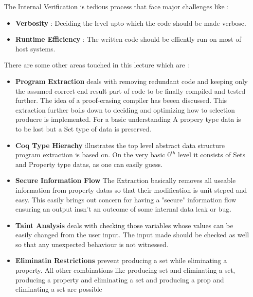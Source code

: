\documentclass[paper=a4, fontsize=11pt]{scrartcl}
\numberwithin{equation}{section}		%
\numberwithin{figure}{section}			%
\numberwithin{table}{section}				%
\begin{document}
The Internal Verification is tedious process that face major challenges like :

\begin{itemize}
	\item{\textbf{Verbosity} : Deciding the level upto which the code should be made verbose. }
	\item{\textbf{Runtime Efficiency} : The written code should be effiently run on most of host systems.} 
\end{itemize}

There are some other areas touched in this lecture which are :
\begin{itemize}
\item{ \textbf{Program Extraction} deals with removing redundant code and keeping only the assumed correct end result part of code to be finally compiled and tested further. The idea of a proof-erasing compiler has beeen discussed. This extraction further boils down to deciding and optimizing how to selection producre is implemented. For a basic understanding A propery type data is to be lost but a Set type of data is preserved.
}
\item{\textbf{Coq Type Hierachy} illustrates the top level abstract data structure program extraction is based on. On the very basic $0^{th}$ level it consists of Sets and Property type datas, as one can easily guess.
}
\item{\textbf{Secure Information Flow} The Extraction basically removes all useable information from property datas so that their modification is unit steped and easy. This easily brings out concern for having a "secure" information flow ensuring an output insn't an outcome of some internal data leak or bug. 
}
\item{\textbf{Taint Analysis} deals with checking those variables whose values can be easily changed from the user input. The input made should be checked as well so that any unexpected behaviour is not witnessed.
}
\item{\textbf{Eliminatin Restrictions} prevent producing a set while eliminating a property. All other combinations like producing set and eliminating a set, producing a property and eliminating a set and producing a prop and eliminating a set are possible


}
\end{itemize}
\end{document}
